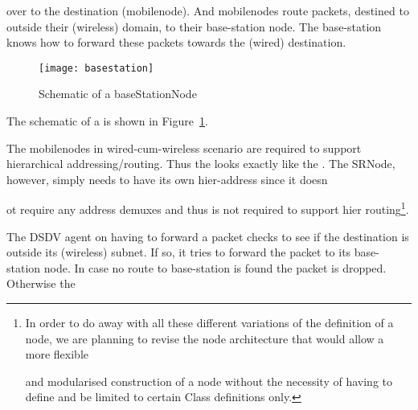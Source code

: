{ over to the destination (mobilenode). And mobilenodes route packets, destined to outside their (wireless) domain, to their base-station node. The base-station knows how to forward these packets towards the (wired) destination. 
\begin{figure}
    \centerline{\texttt{[image: basestation]}}
    \caption{Schematic of a baseStationNode}
    \label{fig:mobilenode-basestation}
\end{figure}
The schematic of a  is shown in Figure~\ref{fig:mobilenode-basestation}.

The mobilenodes in wired-cum-wireless scenario are required to support hierarchical addressing/routing. Thus the  looks exactly like the . The SRNode, however, simply needs to have its own hier-address since it doesn






















ot require any address demuxes and thus is not required to support hier routing\footnote{In order to do away with all these different variations of the definition of a node, we are planning to revise the node architecture that would allow a more flexible 






















and modularised construction of a node without the necessity of having to define and be limited to certain Class definitions only.}.

The DSDV agent on having to forward a packet checks to see if the destination is outside its (wireless) subnet. If so, it tries to forward the packet to its base-station node. In case no route to base-station is found the packet is dropped. Otherwise the 






















}
